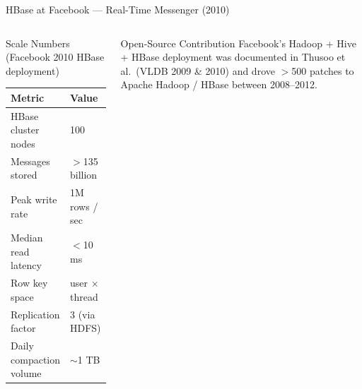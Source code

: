 \documentclass[aspectratio=169,10pt]{beamer}
\begin{document}
\begin{frame}{HBase at Facebook — Real-Time Messenger (2010)}
\begin{columns}[T]
      \begin{block}{Scale Numbers (Facebook 2010 HBase deployment)}
        \renewcommand{\arraystretch}{1.25}
        \begin{tabular}{@{}ll@{}}
          \toprule
          \textbf{Metric}         & \textbf{Value} \\
          \midrule
          HBase cluster nodes     & 100            \\
          Messages stored         & $>$135 billion \\
          Peak write rate         & 1M rows / sec  \\
          Median read latency     & $<$10 ms       \\
          Row key space           & user × thread  \\
          Replication factor      & 3 (via HDFS)   \\
          Daily compaction volume & $\sim$1 TB     \\
          \bottomrule
        \end{tabular}
      \end{block}
      \vspace{5pt}
      \begin{exampleblock}{Open-Source Contribution}
        Facebook's Hadoop + Hive + HBase deployment was documented
        in Thusoo et al.\ (VLDB 2009 \& 2010) and drove
        $>$500 patches to Apache Hadoop / HBase between 2008--2012.
      \end{exampleblock}
  \end{columns}
\end{frame}
\end{document}

